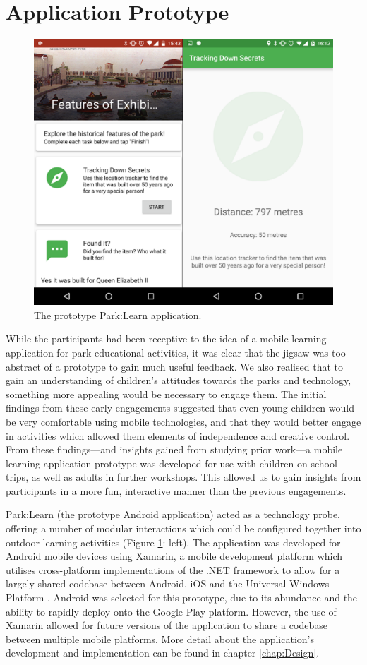\section{Application Prototype}

\begin{figure}
  \centering
  \includegraphics[width=0.8\columnwidth]{images/chapter04/parklearnprototype.png}
  \caption{The prototype Park:Learn application.}
  \label{fig:parklearnPrototype}
\end{figure}

While the participants had been receptive to the idea of a mobile learning application for park educational activities, it was clear that the jigsaw was too abstract of a prototype to gain much useful feedback. We also realised that to gain an understanding of children’s attitudes towards the parks and technology, something more appealing would be necessary to engage them. The initial findings from these early engagements suggested that even young children would be very comfortable using mobile technologies, and that they would better engage in activities which allowed them elements of independence and creative control. From these findings---and insights gained from studying prior work---a mobile learning application prototype was developed for use with children on school trips, as well as adults in further workshops. This allowed us to gain insights from participants in a more fun, interactive manner than the previous engagements.

Park:Learn (the prototype Android application) acted as a technology probe, offering a number of modular interactions which could be configured together into outdoor learning activities (Figure \ref{fig:parklearnPrototype}: left). The application was developed for Android mobile devices using Xamarin, a mobile development platform which utilises cross-platform implementations of the .NET framework to allow for a largely shared codebase between Android, iOS and the Universal Windows Platform \citep{Xamarin2016}. Android was selected for this prototype, due to its abundance and the ability to rapidly deploy onto the Google Play platform. However, the use of Xamarin allowed for future versions of the application to share a codebase between multiple mobile platforms. More detail about the application's development and implementation can be found in chapter \ref{chap:Design}.

